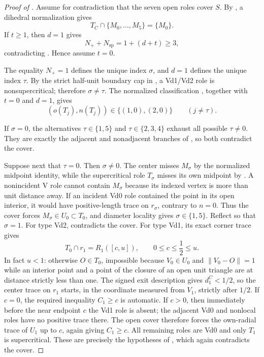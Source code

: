 \begin{proof}[Proof of ]
Assume for contradiction that the seven open roles cover $S$.
By , a dihedral normalization gives
\[
 T_C\cap\{M_0,\ldots,M_5\}=\{M_0\}.
\]
If $t\ge1$, then $d=1$ gives
\[
 N_++N_{\mathrm{sp}}=1+(d+t)\ge3,
\]
contradicting .  Hence assume $t=0$.

The equality $N_+=1$ defines the unique index $\sigma$, and $d=1$ defines
the unique index $\tau$.  By the strict half-unit boundary cap in
, a Vd1/Vd2 role is nonsupercritical;
therefore $\sigma\ne\tau$.  The normalized classification
, together with $t=0$ and $d=1$, gives
\[
 (o(T_j),n(T_j))\in\{(1,0),(2,0)\}
 \qquad(j\ne\tau).
\]

If $\sigma=0$, the alternatives $\tau\in\{1,5\}$ and
$\tau\in\{2,3,4\}$ exhaust all possible $\tau\ne0$.  They are exactly the
adjacent and nonadjacent branches of
, so both contradict the cover.

Suppose next that $\tau=0$.  Then $\sigma\ne0$.  The center misses
$M_\sigma$ by the normalized midpoint identity, while the supercritical
role $T_\sigma$ misses its own midpoint by .
A nonincident V role cannot contain $M_\sigma$ because its indexed vertex is
more than unit distance away.  If an incident Vd0 role contained the point
in its open interior, it would have positive-length trace on $r_\sigma$,
contrary to $n=0$.  Thus the cover forces $M_\sigma\in U_0\subset T_0$, and
diameter locality gives $\sigma\in\{1,5\}$.  Reflect so that $\sigma=1$.
For type Vd2,  contradicts the cover.
For type Vd1, its exact corner trace gives
\[
 T_0\cap r_1=R_1([c,u]),
 \qquad 0\le c\le\frac12\le u.
\]
In fact $u<1$: otherwise $O\in T_0$, impossible because $V_0\in U_0$ and
$\lVert V_0-O\rVert=1$ while an interior point and a point of the closure of
an open unit triangle are at distance strictly less than one.
The signed exit description gives $d_1^C<1/2$, so the center trace on $r_1$
starts, in the coordinate measured from $V_1$, strictly after $1/2$.
If $c=0$, the required inequality $C_1\ge c$ is automatic.  If $c>0$, then
immediately before the near endpoint $c$ the Vd1 role is absent; the adjacent
Vd0 and nonlocal roles have no positive trace there.  The open cover therefore
forces the own-radial trace of $U_1$ up to $c$, again giving $C_1\ge c$.
All remaining roles are Vd0 and only $T_1$ is supercritical.
These are precisely the hypotheses of
, which again contradicts the
cover.


\end{proof}
